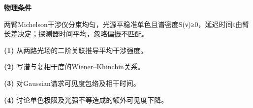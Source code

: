 \textbf{物理条件}\par 两臂Michelson干涉仪分束均匀，光源平稳准单色且谱密度S(ν)≥0，延迟时间τ由臂长差决定；探测器时间平均，忽略偏振不匹配。
\par\noindent\textbf{(1)} 从两路光场的二阶关联推导平均干涉强度。
\par\noindent\textbf{(2)} 写谱与复相干度的Wiener–Khinchin关系。
\par\noindent\textbf{(3)} 对Gaussian谱求可见度包络及相干时间。
\par\noindent\textbf{(4)} 讨论单色极限及光强不等造成的额外可见度下降。
